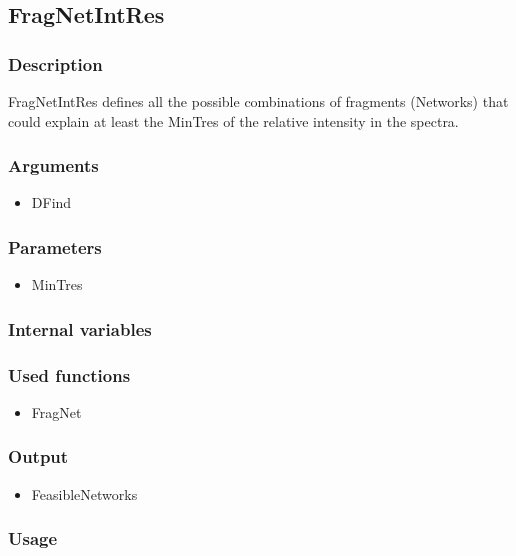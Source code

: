 \subsection{FragNetIntRes}
\subsubsection{Description}
FragNetIntRes defines all the possible combinations of fragments (Networks) that could explain at least the MinTres of the relative intensity in the spectra.
\subsubsection{Arguments}
\begin{itemize}
\item DFind
\end{itemize}
\subsubsection{Parameters}
\begin{itemize}
\item MinTres
\end{itemize}
\subsubsection{Internal variables}
\subsubsection{Used functions}
\begin{itemize}
\item FragNet
\end{itemize}
\subsubsection{Output}
\begin{itemize}
\item FeasibleNetworks
\end{itemize}
\subsubsection{Usage}



